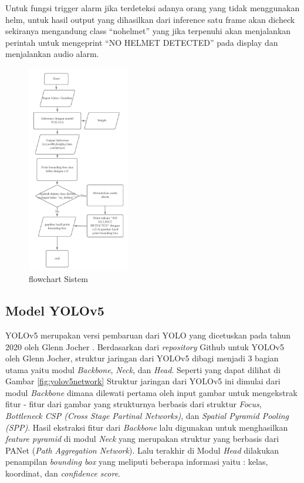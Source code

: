 Untuk fungsi trigger alarm jika terdeteksi adanya orang yang tidak menggunakan helm, untuk hasil output yang dihasilkan dari inference satu frame akan dicheck sekiranya mengandung class “no\textunderscore helmet” yang jika terpenuhi akan  menjalankan perintah untuk mengeprint “NO HELMET DETECTED” pada display dan menjalankan audio alarm. 


\begin{figure} [ht]
  \centering
  \includegraphics[width=0.4\textwidth]{gambar/flowchart_sistem.png}

  \caption{flowchart Sistem}
  \label{fig:cetakbiru}
\end{figure}

\subsection{Model YOLOv5}
\label{subsec:yolov5model}

YOLOv5 merupakan versi pembaruan dari YOLO yang dicetuskan pada tahun 2020 oleh Glenn Jocher \cite{glenn_jocher_yolov5}. Berdasarkan dari \emph{repository} Github untuk YOLOv5 oleh Glenn Jocher, struktur jaringan dari YOLOv5 dibagi menjadi 3 bagian utama yaitu modul \emph{Backbone}, \emph{Neck}, dan \emph{Head}.
Seperti yang dapat dilihat di Gambar \ref{fig:yolov5network} Struktur jaringan dari YOLOv5 ini dimulai dari modul \emph{Backbone} dimana dilewati pertama oleh input gambar untuk mengekstrak fitur - fitur dari gambar yang strukturnya berbasis dari struktur \emph{Focus}, \emph{Bottleneck CSP (Cross Stage Partinal Networks)}, dan \emph{Spatial Pyramid Pooling (SPP)}.
Hasil ekstraksi fitur dari \emph{Backbone} lalu digunakan untuk menghasilkan \emph{feature pyramid} di modul \emph{Neck} yang merupakan struktur yang berbasis dari PANet (\emph{Path Aggregation Network}).
Lalu terakhir di Modul \emph{Head} dilakukan penampilan \emph{bounding box} yang meliputi beberapa informasi yaitu : kelas, koordinat, dan \emph{confidence score}.

